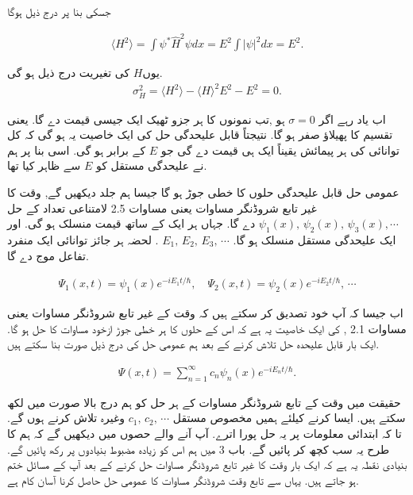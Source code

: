 جسکی بنا پر درج ذیل ہوگا 

\begin{align*}
\langle H^{2} \rangle = \int \psi^{*} \hat{H}^{2} \psi dx = E^{2} \int \left| \psi \right|^{2} dx = E^{2}.
\end{align*}

یوں\( H \) کی تغیریت درج ذیل ہو گی. 
\begin{align}
\sigma^{2}_{H} = \langle H^{2} \rangle - \langle H \rangle^{2} E^{2} - E^{2} = 0.
\end{align}

اب یاد رہے اگر \( \sigma = 0 \)  ہو ,تب نمونوں کا ہر جزو ٹھیک ایک جیسی قیمت دے گا. یعنی تقسیم کا پھیلاؤ صفر ہو گا. نتیجتاً قابل علیحدگی حل کی ایک خاصیت یہ ہو گی کہ کل توانائی کی ہر پیمائش یقیناً ایک ہی قیمت دے گی جو \( E \)  کے برابر ہو گی. اسی بنا پر ہم نے علیحدگی مستقل کو \( E \)  سے ظاہر کیا تھا. 



عمومی حل قابل علیحدگی حلوں کا خطی جوڑ ہو گا جیسا ہم جلد دیکھیں گے, وقت کا غیر تابع شروڈنگر مساوات یعنی مساوات 2.5 لامتناعی تعداد کے حل \( \psi_{1}(x),\, \psi_{2}(x),\, \psi_{3}(x), \cdots \)  دے گا. جہاں ہر ایک کے ساتھ قیمت منسلک ہو گی. اور ایک علیحدگی مستقل منسلک ہو گا. \( E_{1}, \, E_{2}, \, E_{3}, \, \cdots \) . لحضہ ہر جائز توانائی ایک منفرد تفاعل موج دے گا. 

\begin{align*}
\Psi_{1} (x,t) = \psi_{1}(x)e^{-iE_{1}t/\hbar} , \quad \Psi_{2} (x,t) = \psi_{2}(x)e^{-iE_{2}t/\hbar}, \, \cdots 
\end{align*}

اب جیسا کہ آپ خود تصدیق کر سکتے ہیں کہ وقت کے غیر تابع شروڈنگر مساوات یعنی مساوات 2.1 , کی ایک خاصیت یہ ہے کہ اس کے حلوں کا ہر خطی جوڑ ازخود مساوات کا حل ہو گا. ایک بار قابل علیحدہ حل تلاش کرنے کے بعد ہم عمومی حل کی درج ذیل صورت بنا سکتے ہیں. 

\begin{align}
\Psi (x,t) = \sum_{n=1}^{\infty} c_{n} \psi_{n}(x)e^{-iE_{n}t/\hbar}.
\end{align}





حقیقت میں وقت کے تابع شروڈنگر مساوات کے ہر حل کو ہم درج بالا صورت میں لکھ سکتے ہیں. ایسا کرنے کیلئے ہمیں مخصوص مستقل \( c_{1},\, c_{2}, \, \cdots \) وغیرہ تلاش کرنے ہوں گے. تا کہ ابتدائی معلومات پر یہ حل پورا اترے. آپ آنے والے حصوں میں دیکھیں گے کہ ہم کا طرح یہ سب کچھ کر پائیں گے. باب 3 میں  ہم اس کو زیادہ مضبوط بنیادوں پر رکھ پائیں گے. بنیادی نقطہ یہ ہے کہ ایک بار وقت کا غیر تابع شروڈنگر مساوات حل کرنے کے بعد آپ کے مسائل ختم ہو جاتے ہیں. یہاں سے تابع وقت شروڈنگر مساوات کا عمومی حل حاصل کرنا آسان کام ہے. 


